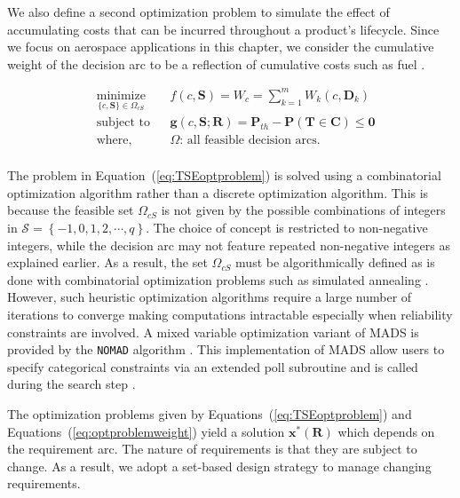 We also define a second optimization problem to simulate the effect of accumulating costs that can be incurred throughout a product's lifecycle. Since we focus on aerospace applications in this chapter, we consider the cumulative weight of the decision arc to be a reflection of cumulative costs such as fuel \cite{Thomsen2016}.

\begin{equation}
	\label{eq:optproblemweight}
	\begin{aligned}
		& \underset{\{c,\mathbf{S}\}\in\Omega_{cS}}{\text{minimize}}
		& & {f}(c,\mathbf{S}) = W_c = \sum\limits_{k=1}^{m} W_{k}(c,\mathbf{D}_k)\\
		& \text{subject to}
		& & \mathbf{g}(c,\mathbf{S};\mathbf{R}) = \mathbf{P}_{th} - \mathbf{P}(\mathbf{T} \in \mathbf{C}) \le \mathbf{0}\\
		& \text{where,}
		& & \Omega\text{: all feasible decision arcs}.\\
	\end{aligned}
\end{equation}

The problem in Equation~(\ref{eq:TSEoptproblem}) is solved using a combinatorial optimization algorithm rather than a discrete optimization algorithm. This is because the feasible set $\Omega_{cS}$ is not given by the possible combinations of integers in $\mathcal{S} = \left\{-1,0,1,2,\cdots,q\right\}$. The choice of concept is restricted to non-negative integers, while the decision arc may not feature repeated non-negative integers as explained earlier. As a result, the set $\Omega_{cS}$ must be algorithmically defined as is done with combinatorial optimization problems such as simulated annealing \cite{Kirkpatrick1983}. However, such heuristic optimization algorithms require a large number of iterations to converge making computations intractable especially when reliability constraints are involved. A mixed variable optimization variant of \ac{MADS} is provided by the \texttt{NOMAD} algorithm \cite{Abramson2009}. This implementation of \ac{MADS} allow users to specify categorical constraints via an extended poll subroutine and is called during the search step \cite{Abramson2004,Abramson2008}.

The optimization problems given by Equations~(\ref{eq:TSEoptproblem}) and Equations~(\ref{eq:optproblemweight}) yield a solution $\mathbf{x}^*(\mathbf{R})$ which depends on the requirement arc. The nature of requirements is that they are subject to change. As a result, we adopt a set-based design strategy to manage changing requirements.


